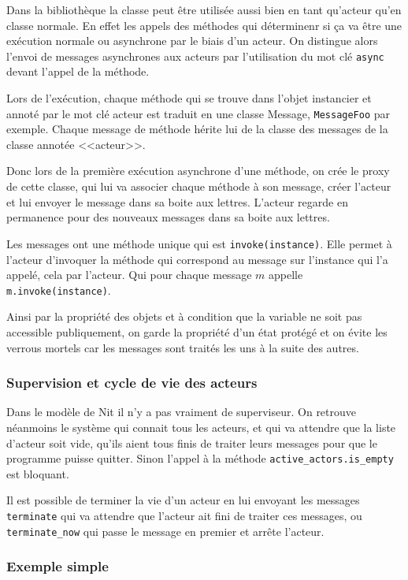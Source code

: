 \documentclass[11pt, a4paper]{article}
\begin{document}
\par Dans la bibliothèque la classe peut être utilisée aussi bien en tant qu'acteur qu'en classe normale. En effet les appels des méthodes qui déterminenr si ça va être une exécution normale ou asynchrone par le biais d'un acteur. On distingue alors l'envoi de messages asynchrones aux acteurs par l'utilisation du mot clé \texttt{async} devant l'appel de la méthode.
\par Lors de l’exécution, chaque méthode qui se trouve dans l'objet instancier et annoté par le mot clé acteur est traduit en une classe Message, \texttt{MessageFoo} par exemple. Chaque message de méthode hérite lui de la classe des messages de la classe annotée <<acteur>>.
\par Donc lors de la première exécution asynchrone d'une méthode, on crée le proxy de cette classe, qui lui va associer chaque méthode à son message, créer l'acteur et lui envoyer le message dans sa boite aux lettres. L'acteur regarde en permanence pour des nouveaux messages dans sa boite aux lettres.
\par Les messages ont une méthode unique qui est \texttt{invoke(instance)}. Elle permet à l'acteur d'invoquer la méthode qui correspond au message sur l'instance qui l'a appelé, cela par l'acteur. Qui pour chaque message $m$ appelle \texttt{m.invoke(instance)}.
\par Ainsi par la propriété des objets et à condition que la variable ne soit pas accessible publiquement, on garde la propriété d'un état protégé et on évite les verrous mortels car les messages sont traités les uns à la suite des autres.

\subsubsection{Supervision et cycle de vie des acteurs}
Dans le modèle de Nit il n'y a pas vraiment de superviseur. On retrouve néanmoins le système qui connait tous les acteurs, et qui va attendre que la liste d'acteur soit vide, qu'ils aient tous finis de traiter leurs messages pour que le programme puisse quitter. Sinon l'appel à la méthode \texttt{active\_actors.is\_empty} est bloquant.
\par 
Il est possible de terminer la vie d'un acteur en lui envoyant les messages \texttt{terminate} qui va attendre que l'acteur ait fini de traiter ces messages, ou \texttt{terminate\_now} qui passe le message en premier et arrête l'acteur.

\subsubsection{Exemple simple}
\end{document}
